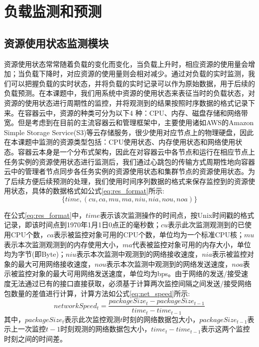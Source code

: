 \section{负载监测和预测}
\subsection{资源使用状态监测模块}\label{sec:monitor}
资源使用状态常常随着负载的变化而变化，当负载上升时，相应资源的使用量会增加；当负载下降时，对应资源的使用量则会相对减少。通过对负载的实时监测，我们可以把握负载的实时状态，并将负载的实时记录可以作为原始数据，用于后续的负载预测。在本课题中，我们用系统中资源的使用状态来表征当时的负载状态，对资源的使用状态进行周期性的监控，并将观测到的结果按照时序数据的格式记录下来。在容器云中，资源的种类可分为以下4 种：CPU、内存、磁盘存储和网络带宽。但是考虑到在目前的主流容器云和管理框架中，主要使用诸如AWS的Amazon Simple Storage Service(S3)等云存储服务，很少使用对应节点上的物理硬盘，因此在本课题中监测的资源类型包括：CPU使用状态、内存使用状态和网络使用状态。容器云本身是一个分布式架构，因此在对容器云中各节点和运行在相应节点上任务实例的资源使用状态进行监测后，我们通过心跳包的传输方式周期性地向容器云中的管理者节点同步各任务实例的资源使用状态和集群节点的资源使用状态。为了后续方便后续预测的处理，我们使用时间序列数据的格式来保存监控到的资源使用状态，具体的数据格式如公式\ref{eq:res_format}所示:
\begin{equation}\label{eq:res_format}
\{time, (cu, ca, mu, ma, niu, nia, nou, noa)\}
\end{equation}

在公式\ref{eq:res_format}中，$time$表示该次监测操作的时间点，按Unix时间戳的格式记录，即该时间点到1970年1月1日0点正的毫秒数；$cu$表示此次监测观测到的已使用CPU个数，$ca$表示被监控对象可用的CPU个数，单位均为一个标准CPU核；$mu$表示本次监测观测到的内存使用大小，$ma$代表被监控对象可用的内存大小，单位均为字节(即Byte)；$niu$表示本次监测中观测到的网络接收速度，$nia$表示被监控对象的最大可用网络接收速度，$nou$表示本次监测中观测到的网络发送速度，$noa$表示被监控对象的最大可用网络发送速度，单位均为bps。由于网络的发送/接受速度无法通过已有的接口直接获取，必须基于计算两次监控间隔之间发送/接受网络包数量的差值进行计算，计算方法如公式\ref{eq:net_speed}所示:
\begin{equation}\label{eq:net_speed}
networkSpeed_t = \frac{packageSize_t-packageSize_{t-1}}{time_t-time_{t-1}}
\end{equation}
其中，$packageSize_t$表示此次监控观测$t$时刻的网络数据包大小，$packageSize_{t-1}$表示上一次监控${t-1}$时刻观测的网络数据包大小，$time_t-time_{t-1}$表示这两个监控时刻之间的时间差。

